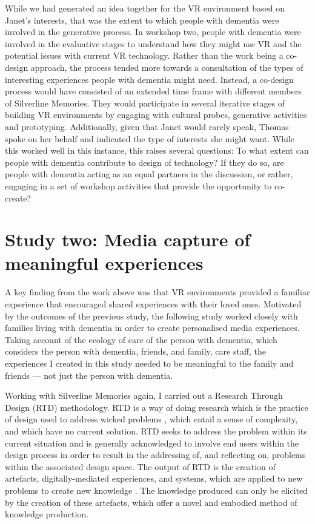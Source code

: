 While we had generated an idea together for the VR environment based on Janet's interests, that was the extent to which people with dementia were involved in the generative process. In workshop two, people with dementia were involved in the evaluative stages to understand how they might use VR and the potential issues with current VR technology. Rather than the work being  a co-design approach, the process tended more towards a consultation of the types of interesting experiences people with dementia might need. Instead, a co-design process would have consisted of an extended time frame with different members of Silverline Memories. They would participate in several iterative stages of building VR environments by engaging with cultural probes, generative activities and prototyping. Additionally, given that Janet would rarely speak, Thomas spoke on her behalf and indicated the type of interests she might want. While this worked well in this instance, this raises several questions: To what extent can people with dementia contribute to design of technology? If they do so, are people with dementia acting as an equal partners in the discussion, or rather, engaging in a set of workshop activities that provide the opportunity to co-create? \citep{tsekleves2020engaging,lindsay_empathy_2012}

\section{Study two: Media capture of meaningful experiences}
\label{studyTwo}
A key finding from the work above was that VR environments provided a familiar experience that encouraged shared experiences with their loved ones. Motivated by the outcomes of the previous study, the following study worked closely with families living with dementia in order to create personalised media experiences. Taking account of the ecology of care of the person with dementia, which considers the person with dementia, friends, and family, care staff, the experiences I created in this study needed to be meaningful to the family and friends — not just the person with dementia. 

Working with Silverline Memories again, I carried out a Research Through Design (RTD) methodology. RTD is a way of doing research which is the practice of design used to address wicked problems \citep{zimmerman_research_2007}, which entail a sense of complexity, and which have no current solution. RTD seeks to address the problem within its current situation and is generally acknowledged to involve end users within the design process in order to result in the addressing of, and reflecting on, problems within the associated design space. The output of RTD is the creation of artefacts, digitally-mediated experiences, and systems, which are applied to new problems to create new knowledge \citep{gaver_what_2012,bardzell_documenting_2016}. The knowledge produced can only be elicited by the creation of these artefacts, which offer a novel and embodied method of knowledge production.

